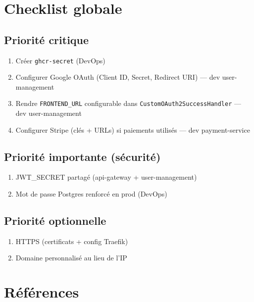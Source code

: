 \documentclass[11pt,a4paper]{article}
\begin{document}
\section{Checklist globale}

\subsection{Priorité critique}

\begin{enumerate}
  \item[$\square$] Créer \texttt{ghcr-secret} (DevOps)
  \item[$\square$] Configurer Google OAuth (Client ID, Secret, Redirect URI) — dev user-management
  \item[$\square$] Rendre \texttt{FRONTEND\_URL} configurable dans \texttt{CustomOAuth2SuccessHandler} — dev user-management
  \item[$\square$] Configurer Stripe (clés + URLs) si paiements utilisés — dev payment-service
\end{enumerate}

\subsection{Priorité importante (sécurité)}

\begin{enumerate}
  \item[$\square$] JWT\_SECRET partagé (api-gateway + user-management)
  \item[$\square$] Mot de passe Postgres renforcé en prod (DevOps)
\end{enumerate}

\subsection{Priorité optionnelle}

\begin{enumerate}
  \item[$\square$] HTTPS (certificats + config Traefik)
  \item[$\square$] Domaine personnalisé au lieu de l’IP
\end{enumerate}

\section{Références}
\end{document}
